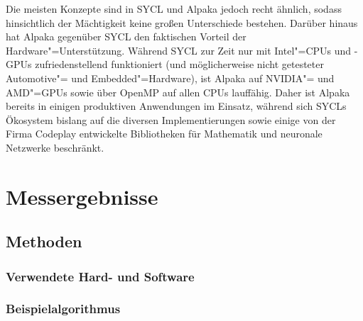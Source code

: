 Die meisten Konzepte sind in SYCL und Alpaka jedoch recht ähnlich, sodass
hinsichtlich der Mächtigkeit keine großen Unterschiede bestehen. Darüber hinaus
hat Alpaka gegenüber SYCL den faktischen Vorteil der Hardware"=Unterstützung.
Während SYCL zur Zeit nur mit Intel"=CPUs und -GPUs zufriedenstellend
funktioniert (und möglicherweise nicht getesteter Automotive"= und
Embedded"=Hardware), ist Alpaka auf NVIDIA"= und AMD"=GPUs sowie über OpenMP auf
allen CPUs lauffähig. Daher ist Alpaka bereits in einigen produktiven
Anwendungen im Einsatz, während sich SYCLs Ökosystem bislang auf die diversen
Implementierungen sowie einige von der Firma Codeplay entwickelte Bibliotheken
für Mathematik und neuronale Netzwerke beschränkt. 

\section{Messergebnisse}
\label{ergebnisse:messergebnisse}

\subsection{Methoden}
\label{ergebnisse:messergebnisse:methoden}

\subsubsection{Verwendete Hard- und Software}
\label{ergebnisse:messergebnisse:methoden:stack}

\subsubsection{Beispielalgorithmus}
\label{ergebnisse:messergebnisse:methoden:algorithmus}

\cite{benner2018}
